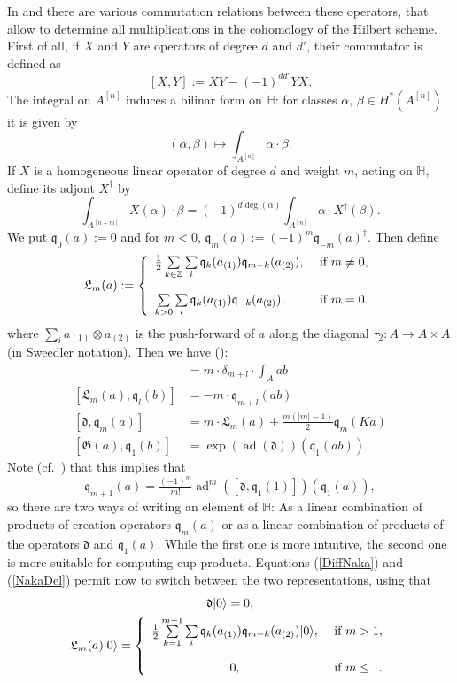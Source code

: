 \documentclass{amsart}
\DeclareMathOperator{\ad}{ad}
\newcommand{\hilb}[1]{^{[#1]}}
\newcommand{\vac}{|0\rangle}
\newcommand{\G}{\mathfrak{G}}
\newcommand{\q}{\mathfrak{q}}
\renewcommand{\H}{\mathbb{H}}
\newcommand{\Z}{\mathbb{Z}}
\theoremstyle{plain}
\theoremstyle{definition}
\theoremstyle{remark}
\begin{document}
In \cite{LehnSorger} and \cite{LiQinWang} there are various commutation relations between these operators, that allow to determine all multiplications in the cohomology of the Hilbert scheme. First of all, if $X$ and $Y$ are operators of degree $d$ and $d'$, their commutator is defined as 
$$
[X,Y] := XY - (-1)^{dd'}YX.
$$
The integral on $A\hilb{n}$ induces a bilinar form on $\H$: for classes $\alpha,\,\beta\in H^*(A\hilb{n})$ it is given by
$$
(\alpha,\beta) \longmapsto \int_{A\hilb{n}}\alpha\cdot\beta.
$$
If $X$ is a homogeneous linear operator of degree $d$ and weight $m$, acting on $\H$, define its adjont $X^\dagger$ by
$$
\int_{A\hilb{n+m}}X(\alpha)\cdot\beta = (-1)^{d\deg(\alpha)}\int_{A\hilb{n}} \alpha \cdot X^\dagger (\beta).
$$
We put $\q_0(a) :=0$ and for $m<0$, $\q_m(a) := (-1)^m \q_{-m}(a)^\dagger$. Then define
$$
\mathfrak{L}_m(a) := \left\{ 
\begin{array}{ll}
 \tfrac{1}{2}\sum\limits_{k\in\Z}\sum\limits_{i}\q_k( a_{(1)})\q_{m-k}( a_{(2)}), & \text{ if } m\neq 0, \vspace{4mm}\\
 \sum\limits_{k>0}\sum\limits_{i}\q_k( a_{(1)})\q_{-k}( a_{(2)}), & \text{ if } m= 0. \\
\end{array}
\right.
$$
where $\sum_i a_{(1)}\otimes  a_{(2)}$ is the push-forward of $a$ along the diagonal $\tau_2 :A \rightarrow A\times A$ (in Sweedler notation).
Then we have (\cite[Thm.~2.16]{LiQinWang}):
\begin{align}
[\q_m(a), \q_l(b)] &= m\cdot \delta_{m+l} \cdot \int_A ab \\
[\mathfrak{L}_m(a),\q_l(b)] &= -m\cdot \q_{m+l}(ab) \\
\label{DiffNaka}
[\mathfrak{d},\q_m(a)] &= m \cdot \mathfrak{L}_m(a) + \tfrac{m(|m|-1)}{2} \q_m(K a) \\
[\G(a),\q_1(b)] &= \exp(\ad(\mathfrak{d}))(\q_1(a b) )
\end{align}
Note (cf.~\cite[Thm.~3.8]{LehnSorger}) that this implies that 
\begin{equation}\label{NakaDel}
\q_{m+1}(a) = \tfrac{(-1)^m}{m!}\ad^m([\mathfrak{d},\q_1(1)])(\q_1(a)),
\end{equation}
so there are two ways of writing an element of $\H$: As a linear combination of products of creation operators $\q_m(a)$ or as a linear combination of products of the operators $\mathfrak{d}$ and $\q_1(a)$. While the first one is more intuitive, the second one is more suitable for computing cup-products. 
Equations (\ref{DiffNaka}) and (\ref{NakaDel}) permit now to switch between the two representations, using that
\begin{gather}
\mathfrak{d} \vac = 0 ,  \\
\mathfrak{L}_m(a) \vac = \left\{ 
\begin{array}{cl}
 \tfrac{1}{2}\sum\limits_{k=1}^{m-1}\sum\limits_{i}\q_k(a_{(1)})\q_{m-k}(a_{(2)})\vac, & \text{ if } m>1, \vspace{4mm}\\
 0, & \text{ if } m\leq 1. \\
\end{array}
\right.\\
\end{gather}
\end{document}

